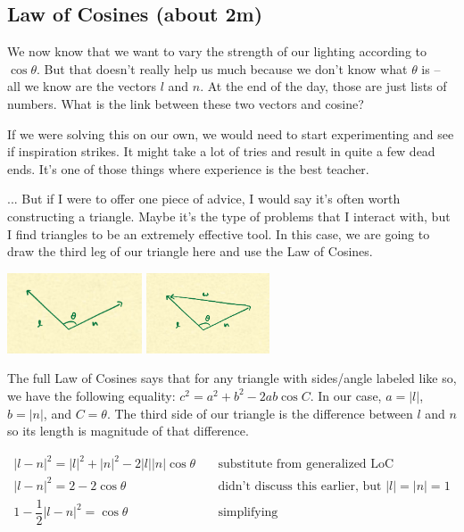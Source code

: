 \documentclass{article}
\begin{document}
\subsection{Law of Cosines (about 2m)}

We now know that we want to vary the strength of our lighting according to $\cos \theta$.
But that doesn't really help us much because we don't know what $\theta$ is -- all we know are the vectors $l$ and $n$.
At the end of the day, those are just lists of numbers.
What is the link between these two vectors and cosine?

If we were solving this on our own, we would need to start experimenting and see if inspiration strikes.
It might take a lot of tries and result in quite a few dead ends.
It's one of those things where experience is the best teacher.

... But if I were to offer one piece of advice, I would say it's often worth constructing a triangle.
Maybe it's the type of problems that I interact with, but I find triangles to be an extremely effective tool.
In this case, we are going to draw the third leg of our triangle here and use the Law of Cosines.

\begin{center}
	\includegraphics[width=0.3\textwidth,frame]{assets/ln.jpg}
	\hspace{0.2\textwidth}
	\includegraphics[width=0.2735\textwidth,frame]{assets/lnw.jpg}
\end{center}

The full Law of Cosines says that for any triangle with sides/angle labeled like so, we have the following equality: $c^2 = a^2 + b^2 - 2ab \cos C$.
In our case, $a = |l|$, $b = |n|$, and $C = \theta$.
The third side of our triangle is the difference between $l$ and $n$ so its length is magnitude of that difference.

\begin{align*}
|l-n|^2 = |l|^2 + |n|^2 - 2 |l| |n| \cos \theta & \quad \text{substitute from generalized LoC} \\
|l-n|^2 = 2 - 2 \cos \theta & \quad \text{didn't discuss this earlier, but } |l| = |n| = 1 \\
1 - \dfrac{1}{2}|l-n|^2 = \cos \theta & \quad \text{simplifying}
\end{align*}
\end{document}
